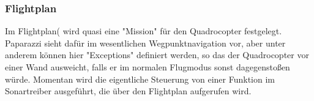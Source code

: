 \subsubsection*{Flightplan}
Im Flightplan( wird quasi eine "Mission" für den Quadrocopter festgelegt.
Paparazzi sieht dafür im wesentlichen Wegpunktnavigation vor, aber unter anderem können hier "Exceptions" definiert werden, so das der Quadrocopter vor einer Wand ausweicht, falls er im normalen Flugmodus sonst dagegenstoßen würde.
Momentan wird die eigentliche Steuerung von einer Funktion im Sonartreiber ausgeführt, die über den Flightplan aufgerufen wird.
